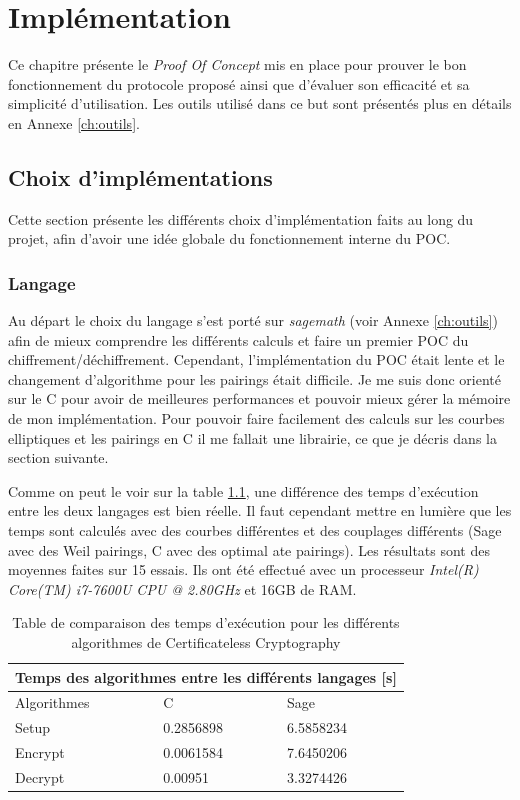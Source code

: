 \chapter{Implémentation}
\label{ch:impl}
Ce chapitre présente le \textit{Proof Of Concept} mis en place pour prouver le bon fonctionnement du protocole proposé ainsi que d'évaluer son efficacité et sa simplicité d'utilisation. Les outils utilisé dans ce but sont présentés plus en détails en Annexe \ref{ch:outils}.
\section{Choix d'implémentations}
Cette section présente les différents choix d'implémentation faits au long du projet, afin d'avoir une idée globale du fonctionnement interne du POC.
\subsection{Langage}
Au départ le choix du langage s'est porté sur \textit{sagemath} (voir Annexe \ref{ch:outils}) afin de mieux comprendre les différents calculs et faire un premier POC du chiffrement/déchiffrement.
Cependant, l'implémentation du POC était lente et le changement d'algorithme pour les pairings était difficile.
Je me suis donc orienté sur le C pour avoir de meilleures performances et pouvoir mieux gérer la mémoire de mon implémentation. Pour pouvoir faire facilement des calculs sur les courbes elliptiques et les pairings en C il me fallait une librairie, ce que je décris dans la section suivante.

Comme on peut le voir sur la table \ref{table:comparisonTimeAlgo}, une différence des temps d'exécution entre les deux langages est bien réelle. Il faut cependant mettre en lumière que les temps sont calculés avec des courbes différentes et des couplages différents (Sage avec des Weil pairings, C avec des optimal ate pairings). Les résultats sont des moyennes faites sur 15 essais. Ils ont été effectué avec un processeur \textit{Intel(R) Core(TM) i7-7600U CPU @ 2.80GHz} et 16GB de RAM.

\begin{table}[h!]
	\centering
	\begin{tabular}{ |p{3cm}||p{3cm}|p{3cm}| }
		\hline
		\multicolumn{3}{|c|}{Temps des algorithmes entre les différents langages [s]} \\
		\hline
		Algorithmes & C & Sage\\
		\hline
		Setup   & 0.2856898 & 6.5858234\\
		Encrypt & 0.0061584 & 7.6450206\\
		Decrypt & 0.00951 & 3.3274426\\
		\hline
	\end{tabular}
\caption{Table de comparaison des temps d'exécution pour les différents algorithmes de Certificateless Cryptography }
\label{table:comparisonTimeAlgo}
\end{table}

